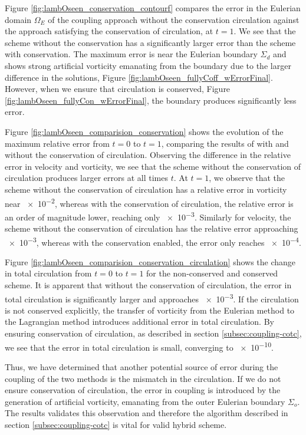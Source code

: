 Figure \ref{fig:lambOseen_conservation_contourf} compares the error in the Eulerian domain $\Omega_E$ of the coupling approach without the conservation circulation against the approach satisfying the conservation of circulation, at $t=1$. We see that the scheme without the conservation has a significantly larger error than the scheme with conservation. The maximum error is near the Eulerian boundary $\Sigma_d$ and shows strong artificial vorticity emanating from the boundary due to the larger difference in the solutions, Figure \ref{fig:lambOseen_fullyCoff_wErrorFinal}. However, when we ensure that circulation is conserved, Figure \ref{fig:lambOseen_fullyCon_wErrorFinal}, the boundary produces significantly less error.
	

Figure \ref{fig:lambOseen_comparision_conservation} shows the evolution of the maximum relative error from $t=0$ to $t=1$, comparing the results of with and without the conservation of circulation. Observing the difference in the relative error in velocity and vorticity, we see that the scheme without the conservation of circulation produces larger errors at all times $t$. At $t=1$, we observe that the scheme without the conservation of circulation has a relative error in vorticity near \num{e-2}, whereas with the conservation of circulation, the relative error is an order of magnitude lower, reaching only \num{e-3}. Similarly for velocity, the scheme without the conservation of circulation has the relative error approaching \num{e-3}, whereas with the conservation enabled, the error only reaches \num{e-4}. 

Figure \ref{fig:lambOseen_comparision_conservation_circulation} shows the change in total circulation from $t=0$ to $t=1$ for the non-conserved and conserved scheme. It is apparent that without the conservation of circulation, the error in total circulation is significantly larger and approaches \num{e-3}. If the circulation is not conserved explicitly, the transfer of vorticity from the Eulerian method to the Lagrangian method introduces additional error in total circulation. By ensuring conservation of circulation, as described in section \ref{subsec:coupling-cotc}, we see that the error in total circulation is small, converging to \num{e-10}. %

Thus, we have determined that another potential source of error during the coupling of the two methods is the mismatch in the circulation. If we do not ensure conservation of circulation, the error in coupling is introduced by the generation of artificial vorticity, emanating from the outer Eulerian boundary $\Sigma_o$. The results validates this observation and therefore the algorithm described in section \ref{subsec:coupling-cotc} is vital for valid hybrid scheme.

